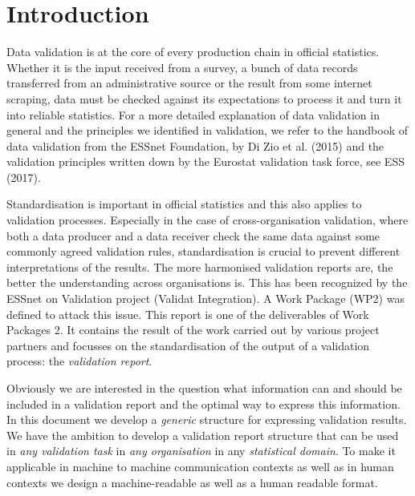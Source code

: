 \section{Introduction}
\label{sect:introduction}

Data validation is at the core of every production chain in official statistics.
Whether it is the input received from a survey, a bunch of data records transferred from an administrative source or the result from some internet scraping,
data must be checked against its expectations to process it and turn it into reliable statistics.
For a more detailed explanation of data validation in general and the principles we identified in validation, we refer to the 
handbook of data validation from the ESSnet Foundation, by Di Zio et al. (2015) and the validation principles written down by the Eurostat validation task force, see ESS (2017).

Standardisation is important in official statistics and this also applies to validation processes.
Especially in the case of cross-organisation validation, where both a data producer and a data receiver check the same data against some
commonly agreed validation rules, standardisation is crucial to prevent different interpretations of the results.
The more harmonised validation reports are, the better the understanding across organisations is.
This has been recognized by the ESSnet on Validation project (Validat Integration).
A Work Package (WP2) was defined to attack this issue.
This report is one of the deliverables of Work Packages 2.
It contains the result of the work carried out by various project partners and focusses on the standardisation of the output of a validation process: the \emph{validation report}.

Obviously we are interested in the question what information can and should be included in a validation report and the optimal way to express this information.
In this document we develop a \emph{generic} structure for expressing validation results.
We have the ambition to develop a validation report structure that can be used in \emph{any validation task} in \emph{any organisation} in any \emph{statistical domain}. 
To make it applicable in machine to machine communication contexts as well as in human contexts we design a machine-readable as well as a human readable format.

